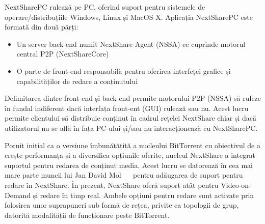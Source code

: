 NextSharePC rulează pe PC, oferind suport pentru sistemele de
operare/distribuțiile Windows, Linux și MacOS X. Aplicația NextSharePC este
formată din două părți:
\begin{itemize}
  \item Un server back-end numit NextShare Agent (NSSA) ce cuprinde motorul
  central P2P (NextShareCore)
  \item O parte de front-end responsabilă pentru oferirea interfeței grafice
  și capabilităților de redare a conținutului
\end{itemize}

Delimitarea dintre front-end și back-end permite motorului P2P (NSSA) să
ruleze în fundal indiferent dacă interfața front-ent (GUI) rulează sau nu. 
Acest lucru permite clientului să distribuie conținut în cadrul rețelei
NextShare chiar și dacă utilizatorul nu se află în fața PC-ului și/sau nu
interacționează cu NextSharePC.

Pornit inițial ca o versiune îmbunătățită a nucleului BitTorrent cu obiectivul
de a crește performanța și a diversifica opțiunile oferite, nucleul NextShare
a integrat suportul pentru redarea de conținut media. Acest lucru se datorează
în cea mai mare parte muncii lui Jan David Mol
~\cite{give-to-get}~\cite{design-p2p-live} pentru adăugarea de suport pentru
redare în NextShare. În prezent, NextShare oferă suport atât pentru
Video-on-Demand și redare în timp real. Ambele opțiuni pentru redare sunt
activate prin folosirea unor suprapuneri sub formă de rețea, privite ca
topologii de grup, datorită modalității de funcționare peste BitTorrent.

